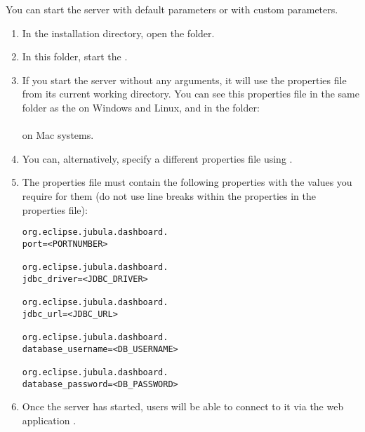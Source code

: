 You can start the \dash{} server with default parameters or with custom parameters. 

\begin{enumerate}
\item In the installation directory, open the  folder. 
\item In this folder, start the . 
\item If you start the server without any arguments, it will use the properties file  from its current working directory. You can see this properties file in the same folder as the  on Windows and Linux, and in the folder:\\
\\
on Mac systems. 
\item You can, alternatively, specify a different properties file using .
\item The properties file must contain the following properties with the values you require for them (do not use line breaks within the properties in the properties file):
\begin{verbatim}
org.eclipse.jubula.dashboard.
port=<PORTNUMBER>

org.eclipse.jubula.dashboard.
jdbc_driver=<JDBC_DRIVER>

org.eclipse.jubula.dashboard.
jdbc_url=<JDBC_URL>

org.eclipse.jubula.dashboard.
database_username=<DB_USERNAME>

org.eclipse.jubula.dashboard.
database_password=<DB_PASSWORD>
\end{verbatim}
\item Once the \dash{} server has started, users will be able to connect to it via the web application .
\end{enumerate}
